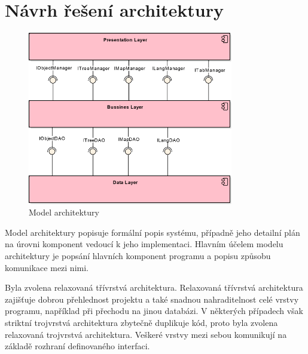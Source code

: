 \documentclass[thesis=B,czech]{resources/FITthesis}[2012/06/26]
\begin{document}
	\section{Návrh řešení architektury}
\begin{figure}\centering
	\includegraphics[width=0.8\textwidth]{images/architektura}
	\caption[Model architektury]{Model architektury}\label{fig:architektura}
\end{figure}
Model architektury popisuje formální popis systému, případně jeho detailní plán na úrovni komponent vedoucí k jeho implementaci. Hlavním účelem modelu architektury je popsání hlavních komponent programu a popisu způsobu komunikace mezi nimi.\par

Byla zvolena relaxovaná třívrstvá architektura. Relaxovaná třívrstvá architektura zajišťuje dobrou přehlednost projektu a také snadnou nahraditelnost celé vrstvy programu, například při přechodu na jinou databázi. V některých případech však striktní trojvrstvá architektura zbytečně duplikuje kód, proto byla zvolena relaxovaná trojvrstvá architektura. Veškeré vrstvy mezi sebou komunikují na základě rozhraní definovaného interfaci.\\
\end{document}
